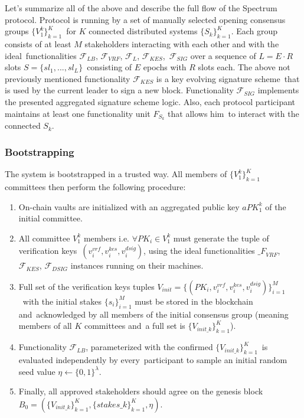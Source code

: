 Let's summarize all of the above and describe the full flow of the Spectrum protocol.
Protocol is running by a set of manually selected opening consensus groups $\{V^k_1\}_{k=1}^K$\
for $K$ connected distributed systems $\{S_k\}_{k=1}^K$.
Each group consists of at least $M$ stakeholders interacting with each other and with the ideal\
functionalities ${\mathcal{F}}_{LB}$, ${\mathcal{F}}_{VRF}$, ${\mathcal{F}}_{L}$, ${\mathcal{F}}_{KES}$,\
${\mathcal{F}}_{SIG}$ over a sequence of $L = E \cdot R$ slots ${S=\{sl_1,...,sl_L\}}$\
consisting of $E$ epochs with $R$ slots each.
The above not previously mentioned functionality ${\mathcal{F}}_{KES}$ is a key evolving signature scheme\
that is used by the current leader to sign a new block.
Functionality ${\mathcal{F}}_{SIG}$ implements the presented aggregated signature scheme logic.
Also, each protocol participant maintains at least one functionality unit $F_{S_k}$ that allows him\
to interact with the connected $S_k$.

\subsubsection{Bootstrapping}\label{subsubsec:bootstrapping}

The system is bootstrapped in a trusted way.
All members of $\{V^k_1\}_{k=1}^K$ committees then perform the following procedure:
\begin{enumerate}
    \item On-chain vaults are initialized with an aggregated public key $aPK^k_1$ of the initial committee.

    \item All committee $V^k_1$ members i.e. $\forall PK_i \in V^k_1$ must generate the tuple of verification keys\
    ${(v_i^{vrf}, v_i^{kes}, v_i^{dsig})}$, using the ideal functionalities ${\mathcal_{F}}_{VRF}$,\
    ${\mathcal{F}}_{KES}$, ${\mathcal{F}}_{DSIG}$ instances running on their machines.

    \item Full set of the verification keys tuples ${V_{init} = \{(PK_i, v_i^{vrf}, v_i^{kes}, v_i^{dsig})\}_{i=1}^M}$\
    with the initial stakes $\{s_i\}_{i=1}^M$ must be stored in the blockchain and\
    acknowledged by all members of the initial consensus group (meaning members of all $K$ committees and\
    a full set is $\{V_{init\_k}\}_{k=1}^{K}$).

    \item Functionality ${\mathcal{F}}_{LB}$, parameterized with the confirmed $\{V_{init\_k}\}_{k=1}^{K}$\
    is evaluated independently by every\
    participant to sample an initial random seed value $\eta \leftarrow \{0, 1\}^\lambda$.

    \item Finally, all approved stakeholders should agree on the genesis block\
    ${B_0=\left(\{V_{init\_k}\}_{k=1}^{K}, \{stakes\_k\}_{k=1}^{K}, \eta\right)}$.
\end{enumerate}

